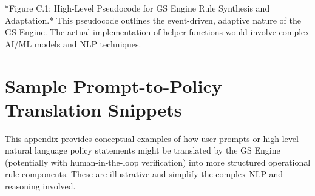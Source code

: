 \documentclass[sigconf,review,anonymous=false]{acmart} %
\begin{document}
\begin{algorithm}[htbp]
{{{{            \;
        }
      }
    }
  }
\Indm
\end{algorithm}
*Figure C.1: High-Level Pseudocode for GS Engine Rule Synthesis and Adaptation.* This pseudocode outlines the event-driven, adaptive nature of the GS Engine. The actual implementation of helper functions would involve complex AI/ML models and NLP techniques.

\section{Sample Prompt-to-Policy Translation Snippets}
\label{app:prompt_to_policy}
This appendix provides conceptual examples of how user prompts or high-level natural language policy statements might be translated by the GS Engine (potentially with human-in-the-loop verification) into more structured operational rule components. These are illustrative and simplify the complex NLP and reasoning involved.
\end{document}
